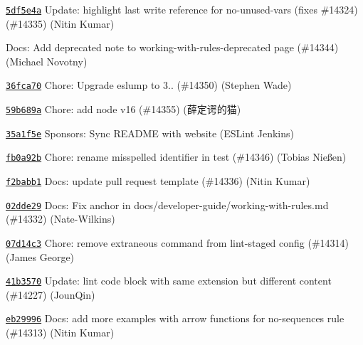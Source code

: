 \begin{DoxyItemize}
\item \href{https://github.com/eslint/eslint/commit/5df5e4a9976964fcf4dc67e241d4e22ec1370fe0}{\texttt{ {\ttfamily 5df5e4a}}} Update\+: highlight last write reference for no-\/unused-\/vars (fixes \#14324) (\#14335) (Nitin Kumar)
\item \href{https://github.com/eslint/eslint/commit/00238729329b86b4f8af89ebfe278da3095a6075}{\texttt{ {}}} Docs\+: Add deprecated note to {\ttfamily working-\/with-\/rules-\/deprecated} page (\#14344) (Michael Novotny)
\item \href{https://github.com/eslint/eslint/commit/36fca70fa29ab65080076810de98e09133254b8a}{\texttt{ {\ttfamily 36fca70}}} Chore\+: Upgrade eslump to 3.. (\#14350) (Stephen Wade)
\item \href{https://github.com/eslint/eslint/commit/59b689a0b3fa658b8380431007cc1facb4617a3b}{\texttt{ {\ttfamily 59b689a}}} Chore\+: add node v16 (\#14355) (薛定谔的猫)
\item \href{https://github.com/eslint/eslint/commit/35a1f5e967e4e87360d3e70d3fca0f7adeeaa1d7}{\texttt{ {\ttfamily 35a1f5e}}} Sponsors\+: Sync README with website (ESLint Jenkins)
\item \href{https://github.com/eslint/eslint/commit/fb0a92b3d2fed4a17bc39b7f02c540cd1175ec7d}{\texttt{ {\ttfamily fb0a92b}}} Chore\+: rename misspelled identifier in test (\#14346) (Tobias Nießen)
\item \href{https://github.com/eslint/eslint/commit/f2babb1069194166e0ac1afd1269bbd06ac299b6}{\texttt{ {\ttfamily f2babb1}}} Docs\+: update pull request template (\#14336) (Nitin Kumar)
\item \href{https://github.com/eslint/eslint/commit/02dde29eeb523ca24bc4ae7797d38627c3ba9fe9}{\texttt{ {\ttfamily 02dde29}}} Docs\+: Fix anchor in \textquotesingle{}docs/developer-\/guide/working-\/with-\/rules.\+md\textquotesingle{} (\#14332) (Nate-\/\+Wilkins)
\item \href{https://github.com/eslint/eslint/commit/07d14c304c358fbc9c3d318e1377d2b2bda9179f}{\texttt{ {\ttfamily 07d14c3}}} Chore\+: remove extraneous command from lint-\/staged config (\#14314) (James George)
\item \href{https://github.com/eslint/eslint/commit/41b3570b6c014c534bb3208ed00050fd99842101}{\texttt{ {\ttfamily 41b3570}}} Update\+: lint code block with same extension but different content (\#14227) (Joun\+Qin)
\item \href{https://github.com/eslint/eslint/commit/eb299966bdc3920dd2c6f9774d95103d242fc409}{\texttt{ {\ttfamily eb29996}}} Docs\+: add more examples with arrow functions for no-\/sequences rule (\#14313) (Nitin Kumar)
\end{DoxyItemize}


